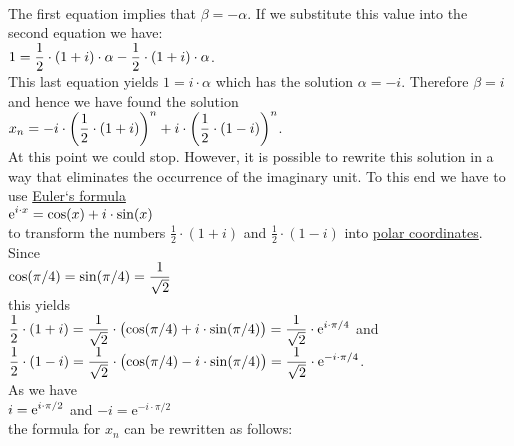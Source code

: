 \\[0.2cm]
The first equation implies that $\beta = -\alpha$.  If we substitute this value into the second equation we have:
\\[0.2cm]
\hspace*{1.3cm}
$\displaystyle 1 = \frac{1}{2} \cdot (1 + i) \cdot \alpha - \frac{1}{2} \cdot (1 + i) \cdot \alpha$.
\\[0.2cm]
This last equation yields $1 = i \cdot \alpha$ which has the solution $\alpha = -i$.  Therefore $\beta = i$
and hence we have found the solution
\\[0.2cm]
\hspace*{1.3cm}
$\displaystyle x_n = -i \cdot \left(\frac{1}{2} \cdot (1 + i)\right)^n + i \cdot \left(\frac{1}{2} \cdot (1 - i)\right)^n$.
\\[0.2cm]
At this point we could stop.  However, it is possible to rewrite this solution in a way that eliminates the
occurrence of the imaginary unit.  To this end we have to use
\href{https://en.wikipedia.org/wiki/Euler%27s_formula}{Euler`s formula} 
\\[0.2cm]
\hspace*{1.3cm}
$\displaystyle \mathrm{e}^{i \cdot x} = \cos(x) + i \cdot \sin(x)$
\\[0.2cm]
to transform the numbers
$\frac{1}{2} \cdot (1 + i)$ and $\frac{1}{2} \cdot (1 - i)$ into
\href{https://en.wikipedia.org/wiki/Polar_coordinate_system#Complex_numbers}{polar coordinates}.  Since
\\[0.2cm]
\hspace*{1.3cm}
$\displaystyle \cos(\pi/4) = \sin(\pi/4) = \frac{1}{\sqrt{2}}$
\\[0.2cm]
this yields
\\[0.2cm]
\hspace*{1.3cm}
$\displaystyle \frac{1}{2} \cdot (1 + i) = \frac{1}{\sqrt{2}} \cdot \bigl(\cos(\pi/4) + i \cdot \sin(\pi/4) \bigr) =
 \frac{1}{\sqrt{2}} \cdot \mathrm{e}^{i \cdot\pi/4}$ \quad and 
\\[0.2cm]
\hspace*{1.3cm}
$\displaystyle \frac{1}{2} \cdot (1 - i) = \frac{1}{\sqrt{2}} \cdot \bigl(\cos(\pi/4) - i \cdot \sin(\pi/4) \bigr) =
 \frac{1}{\sqrt{2}} \cdot \mathrm{e}^{-i \cdot\pi/4}$. 
\\[0.2cm]
As we have 
\\[0.2cm]
\hspace*{1.3cm}
$\displaystyle i = \mathrm{e}^{i \cdot\pi/2}$  \quad and \quad $-i = \mathrm{e}^{-i \cdot\pi/2}$
\\[0.2cm]
the formula for $x_n$ can be rewritten as follows:
